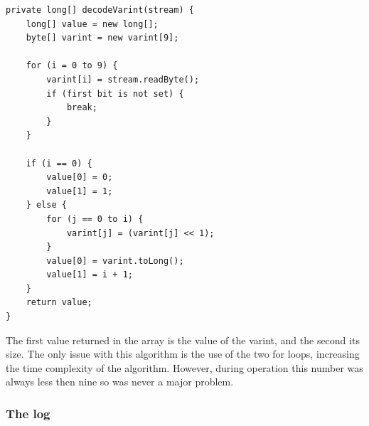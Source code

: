 \begin{lstlisting}	
private long[] decodeVarint(stream) {
	long[] value = new long[];
	byte[] varint = new varint[9];
	
	for (i = 0 to 9) {
		varint[i] = stream.readByte();
		if (first bit is not set) {
			break;
		}
	}
	
	if (i == 0) {
		value[0] = 0;
		value[1] = 1;
	} else {
		for (j == 0 to i) {
			varint[j] = (varint[j] << 1);
		}
		value[0] = varint.toLong();
		value[1] = i + 1;
	}
	return value;
}
\end{lstlisting}

The first value returned in the array is the value of the varint, and the second its size. The only issue with this algorithm is the use of the two for loops, increasing the time complexity of the algorithm. However, during operation this number was always less then nine so was never a major problem.

\subsubsection{The log}
\label{subsubsec:log_imp}

